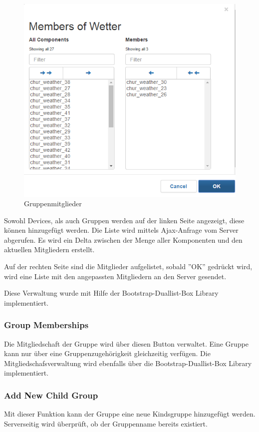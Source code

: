 \begin{figure}[H]
\centering
\includegraphics[scale=0.8]{../04_Realisierung/images/userinterface/groupmembers.png}
\caption{Gruppenmitglieder}
\end{figure}

Sowohl Devices, als auch Gruppen werden auf der linken Seite angezeigt, diese können hinzugefügt werden. Die Liste wird mittels Ajax-Anfrage vom Server abgerufen. Es wird ein Delta zwischen der Menge aller Komponenten und den aktuellen Mitgliedern erstellt.

Auf der rechten Seite sind die Mitglieder aufgelistet, sobald ''OK'' gedrückt wird, wird eine Liste mit den angepassten Mitgliedern an den Server gesendet.

Diese Verwaltung wurde mit Hilfe der Bootstrap-Duallist-Box Library implementiert. 
\subsubsection{Group Memberships}
Die Mitgliedschaft der Gruppe wird über diesen Button verwaltet. Eine Gruppe kann nur über eine Gruppenzugehörigkeit gleichzeitig verfügen. Die Mitgliedschafsverwaltung wird ebenfalls über die Bootstrap-Duallist-Box Library implementiert.

\subsubsection{Add New Child Group}
Mit dieser Funktion kann der Gruppe eine neue Kindsgruppe hinzugefügt werden. Serverseitig wird überprüft, ob der Gruppenname bereits existiert.
